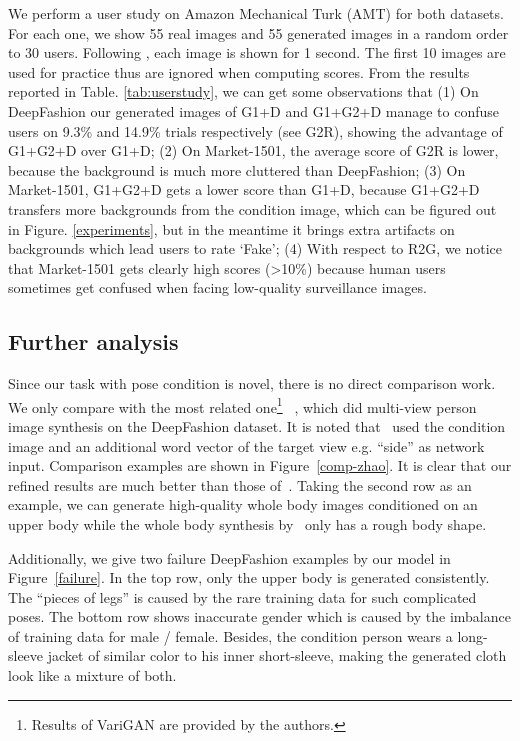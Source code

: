 \documentclass{article}
\begin{document}
We perform a user study on Amazon Mechanical Turk (AMT) for both datasets. For each one, we show 55 real images and 55 generated images in a random order to 30 users. Following \cite{Isola-CVPR16-Pix2pix,Lassner17ClothNet}, each image is shown for 1 second. The first 10 images are used for practice thus are ignored when computing scores.  From the results reported in Table. \ref{tab:userstudy}, we can get some observations that (1) On DeepFashion our generated images of G1+D and G1+G2+D manage to confuse users on 9.3\% and 14.9\% trials respectively (see G2R), showing the advantage of G1+G2+D over G1+D;
(2) On Market-1501, the average score of G2R is lower, because the background is much more cluttered than DeepFashion; (3) On Market-1501, G1+G2+D gets a lower score than G1+D, because G1+G2+D transfers more backgrounds from the condition image, which can be figured out in Figure. \ref{experiments}, but in the meantime it brings extra artifacts on backgrounds which lead users to rate ‘Fake’; (4) With respect to R2G, we notice that Market-1501 gets clearly high scores (>10\%) because human users sometimes get confused when facing low-quality surveillance images. 

\subsection{Further analysis}
Since our task with pose condition is novel, there is no direct comparison work. We only compare with the most related one\footnote{Results of VariGAN are provided by the authors.} ~\cite{Zhao-Arxiv16-Multiview}, which did multi-view person image synthesis on the DeepFashion dataset. It is noted that~\cite{Zhao-Arxiv16-Multiview} used the condition image and an additional word vector of the target view e.g. ``side'' as network input. Comparison examples are shown in Figure~\ref{comp-zhao}. It is clear that our refined results are much better than those of~\cite{Zhao-Arxiv16-Multiview}. Taking the second row as an example, we can generate high-quality whole body images conditioned on an upper body while the whole body synthesis by~\cite{Zhao-Arxiv16-Multiview} only has a rough body shape.


Additionally, we give two failure DeepFashion examples by our model in Figure~\ref{failure}. In the top row, only the upper body is generated consistently. The ``pieces of legs'' is caused by the rare training data for such complicated poses. The bottom row shows inaccurate gender which is caused by the imbalance of training data for male / female. 
Besides, the condition person wears a long-sleeve jacket of similar color to  his inner short-sleeve, making the generated cloth look like a mixture of both.
\end{document}
